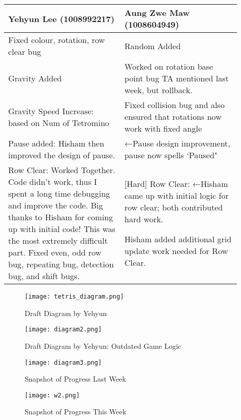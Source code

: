 \documentclass{article}
\begin{document}
\begin{center}
\begin{center}
\begin{tabular}{|| p{0.45\linewidth} | p{0.45\linewidth} ||}
\hline
Yehyun Lee (1008992217) & Aung Zwe Maw (1008604949) \\ \hline
Fixed colour, rotation, row clear bug & Random Added \\
\hline
[Ez] Gravity Added & Worked on rotation base point bug TA mentioned last week, but rollback. \\
\hline
[Ez] Gravity Speed Increase: based on Num of Tetromino & Fixed collision bug and also ensured that rotations now work with fixed angle \\
\hline
[Ez] Pause added: Hisham then improved the design of pause. & ←Pause design improvement, pause now spells `Paused"\\
\hline
[Hard] Row Clear: Worked Together. Code didn't work, thus I spent a long time debugging and improve the code. Big thanks to Hisham for coming up with initial code! This was the most extremely difficult part. Fixed even, odd row bug, repeating bug, detection bug, and shift bugs. 
& [Hard] Row Clear: ←Hisham came up with initial logic for row clear; both contributed hard work.

Hisham added additional grid update work needed for Row Clear.
\\
\hline
\end{tabular}
\end{center}


\begin{figure}[ht!]
    \centering
    \texttt{[image: tetris\_diagram.png]}
    \caption{Draft Diagram by Yehyun}
    \label{f:1}
\end{figure}

\begin{figure}[ht!]
    \centering
    \texttt{[image: diagram2.png]}
    \caption{Draft Diagram by Yehyun: Outdated Game Logic}
    \label{f:1}
\end{figure}


\begin{figure}[ht!]
    \centering
    \texttt{[image: diagram3.png]}
    \caption{Snapshot of Progress Last Week}
    \label{f:1}
\end{figure}
\begin{figure}[ht!]
    \centering
    \texttt{[image: w2.png]}
    \caption{Snapshot of Progress This Week}
    \label{f:1}
\end{figure}



\end{center}


\end{document}
